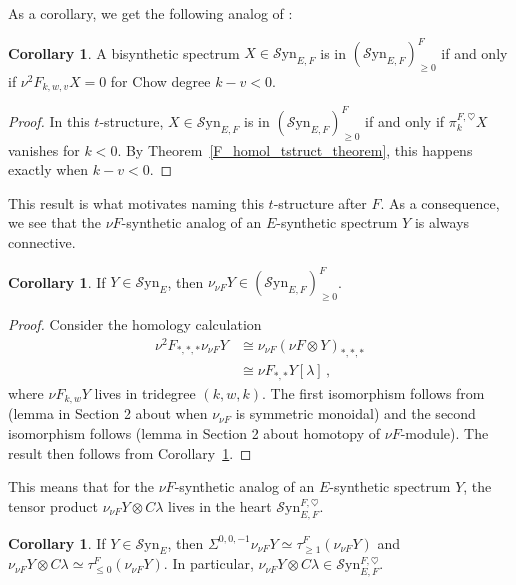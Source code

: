 \documentclass[10pt]{amsart}
\theoremstyle{definition}
\numberwithin{figure}{section}
\numberwithin{equation}{section}
\newtheorem{corollary}[figure]{Corollary}
\theoremstyle{cited}
\newcommand{\Syn}{\mathcal{S}\mathrm{yn}}
\begin{document}
As a corollary, we get the following analog of \cite[Cor. 4.19]{Pst22}:

\begin{corollary}
\label{F_chow_degree_cor}
A bisynthetic spectrum $X\in\Syn_{E,F}$ is in $(\Syn_{E,F})_{\geq 0}^F$ if and only if $\nu^2F_{k,w,v}X =0$ for Chow degree $k-v<0$. 
\end{corollary}

\begin{proof}
    In this $t$-structure, $X\in\Syn_{E,F}$ is in $(\Syn_{E,F})_{\geq 0}^F$ if and only if $\pi_k^{F,\heartsuit}X$ vanishes for $k<0$. By Theorem~\ref{F_homol_tstruct_theorem}, this happens exactly when $k-v<0$.
\end{proof}

This result is what motivates naming this $t$-structure after $F$. As a consequence, we see that the $\nu F$-synthetic analog of an $E$-synthetic spectrum $Y$ is always connective.

\begin{corollary}
    If $Y\in\Syn_E$, then $\nu_{\nu F}Y\in (\Syn_{E,F})_{\geq 0}^F$.
\end{corollary}

\begin{proof}
    Consider the homology calculation
\begin{equation*}
    \begin{aligned}
        \nu^2F_{*,*,*}\nu_{\nu F}Y &\cong \nu_{\nu F}(\nu F\otimes Y)_{*,*,*} \\
        &\cong \nu F_{*,*} Y[\lambda]\, ,
    \end{aligned}
\end{equation*}
where $\nu F_{k,w} Y$ lives in tridegree $(k,w,k)$. The first isomorphism follows from (lemma in Section 2 about when $\nu_{\nu F}$ is symmetric monoidal) and the second isomorphism follows (lemma in Section 2 about homotopy of $\nu F$-module). The result then follows from Corollary~\ref{F_chow_degree_cor}.
\end{proof}

This means that for the $\nu F$-synthetic analog of an $E$-synthetic spectrum $Y$, the tensor product $\nu_{\nu F}Y\otimes C\lambda$ lives in the heart $\Syn_{E,F}^{F,\heartsuit}$.

\begin{corollary}
If $Y\in\Syn_E$, then $\Sigma^{0,0,-1}\nu_{\nu F}Y\simeq \tau_{\geq 1}^F(\nu_{\nu F}Y)$ and $\nu_{\nu F} Y\otimes C\lambda\simeq \tau_{\leq 0}^F(\nu_{\nu F}Y)$. In particular, $\nu_{\nu F}Y\otimes C\lambda\in \Syn_{E,F}^{F,\heartsuit}$.  
\end{corollary}
\end{document}

